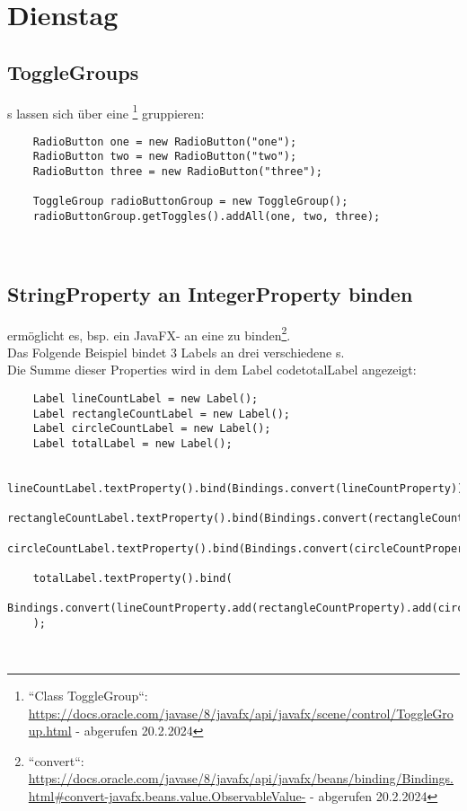 \section{Dienstag}

\subsection*{ToggleGroups}
s lassen sich über eine \footnote{
``Class ToggleGroup``: \url{https://docs.oracle.com/javase/8/javafx/api/javafx/scene/control/ToggleGroup.html} - abgerufen 20.2.2024
} gruppieren:

\begin{verbatim}
    RadioButton one = new RadioButton("one");
    RadioButton two = new RadioButton("two");
    RadioButton three = new RadioButton("three");

    ToggleGroup radioButtonGroup = new ToggleGroup();
    radioButtonGroup.getToggles().addAll(one, two, three);
\end{verbatim}\\

\subsection*{StringProperty an IntegerProperty binden}

\begin{center}\end{center}
ermöglicht es, bsp. ein JavaFX- an eine  zu binden\footnote{
``convert``: \url{https://docs.oracle.com/javase/8/javafx/api/javafx/beans/binding/Bindings.html#convert-javafx.beans.value.ObservableValue-} - abgerufen 20.2.2024
}.\\

\noindent
Das Folgende Beispiel bindet 3 Labels an drei verschiedene s.\\
Die Summe dieser Properties wird in dem Label code{totalLabel} angezeigt:
\begin{verbatim}
    Label lineCountLabel = new Label();
    Label rectangleCountLabel = new Label();
    Label circleCountLabel = new Label();
    Label totalLabel = new Label();

    lineCountLabel.textProperty().bind(Bindings.convert(lineCountProperty));
    rectangleCountLabel.textProperty().bind(Bindings.convert(rectangleCountProperty));
    circleCountLabel.textProperty().bind(Bindings.convert(circleCountProperty));

    totalLabel.textProperty().bind(
        Bindings.convert(lineCountProperty.add(rectangleCountProperty).add(circleCountProperty))
    );

\end{verbatim}\\